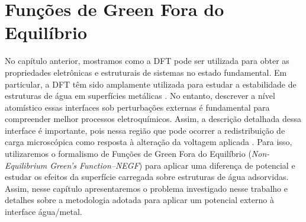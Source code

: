 \chapter{Funções de Green Fora do Equilíbrio \label{cap:green}}


No capítulo anterior, mostramos como a DFT pode ser utilizada para obter as propriedades eletrônicas e estruturais de sistemas no estado fundamental. Em particular, a DFT têm sido amplamente utilizada para estudar a estabilidade de estruturas de água em superfícies metálicas \cite{review_new}. No entanto, descrever a nível atomístico essas interfaces sob perturbações externas é fundamental para compreender melhor processos eletroquímicos. Assim, a descrição detalhada dessa interface é importante, pois nessa região que pode ocorrer a redistribuição de carga microscópica como resposta à alteração da voltagem aplicada \cite{review-electro}. Para isso, utilizaremos o formalismo de Funções de Green Fora do Equilíbrio (\textit{Non-Equilibrium Green's Function--NEGF}) para aplicar uma diferença de potencial e estudar os efeitos da superfície carregada sobre estruturas de água adsorvidas. Assim, nesse capítulo apresentaremos o problema investigado nesse trabalho e detalhes sobre a metodologia adotada para aplicar um potencial externo à interface água/metal.

